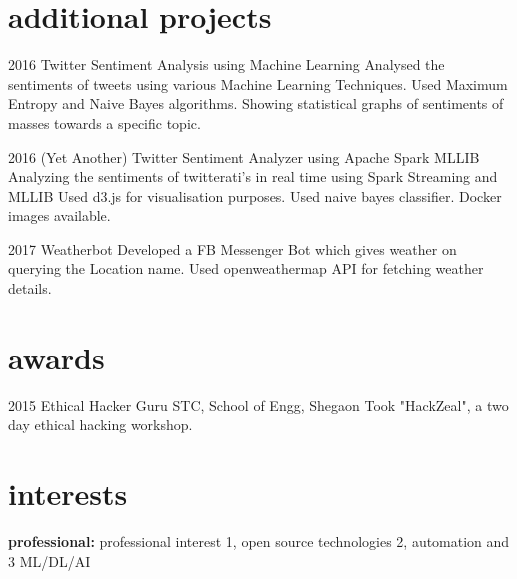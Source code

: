 \documentclass[]{cv-style}          %
\begin{document}

\section{additional projects}

\begin{entrylist}
\entry
{2016}
{Twitter Sentiment Analysis using Machine Learning}
{ }
{Analysed the sentiments of tweets using various Machine Learning Techniques.
Used Maximum Entropy and Naive Bayes algorithms. Showing statistical graphs of sentiments of masses towards a specific topic.}

\entry
{2016}
{(Yet Another) Twitter Sentiment Analyzer using Apache Spark MLLIB}
{ }
{Analyzing the sentiments of twitterati’s in real time using Spark Streaming and MLLIB Used d3.js for visualisation purposes. Used naive bayes classifier. Docker images available. }

\entry
{2017}
{Weatherbot}
{ }
{Developed a FB Messenger Bot which gives weather on querying the Location name. Used openweathermap API for fetching weather details.}

{\hspace{-0.3cm}}
\end{entrylist}


\section{awards}

\begin{entrylist}
\entry
{2015}
{Ethical Hacker Guru}
{STC, School of Engg, Shegaon}
{Took "HackZeal", a two day ethical hacking workshop.}
\end{entrylist}


\section{interests}
  \vspace{-0.2cm}

\textbf{professional:} professional interest 1, open source technologies 2, automation and 3 ML/DL/AI 
\end{document}
